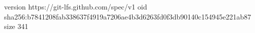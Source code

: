 version https://git-lfs.github.com/spec/v1
oid sha256:b7841208fab338637f4919a7206ae4b3d6263fd0f3db90140c154945e221ab87
size 341
